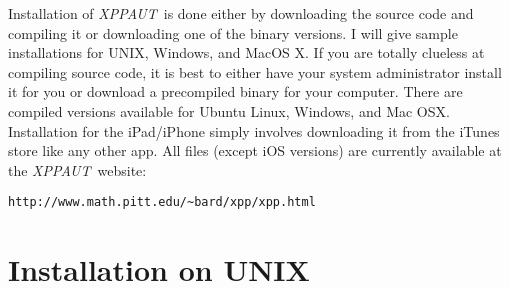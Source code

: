 \documentclass{article}
\newcommand{\XPP}{{\sl XPPAUT\, }}
\begin{document}
Installation of \XPP is done either by
downloading the source code and compiling it or downloading one of the
binary versions. I will give sample installations for UNIX, 
Windows, and MacOS X. 
 If you are totally clueless at compiling source code, it is best to
either have your system administrator install it for you or download a
precompiled binary for your computer. There are compiled versions
available for Ubuntu Linux, Windows, and Mac OSX. Installation for the
iPad/iPhone simply involves downloading it from the iTunes store like any
other app. All files (except iOS versions) are currently available at the \XPP website: 
\begin{verbatim}
http://www.math.pitt.edu/~bard/xpp/xpp.html
\end{verbatim} 
\section{Installation on UNIX} 
\end{document}
